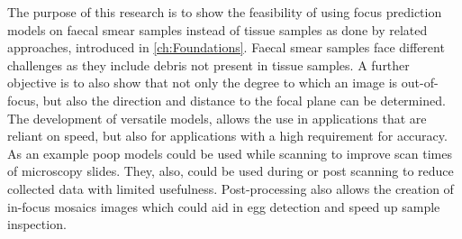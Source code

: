 The purpose of this research is to show the feasibility of using focus prediction models on faecal smear samples instead of tissue samples as done by related approaches, introduced in \autoref{ch:Foundations}. Faecal smear samples face different challenges as they include debris not present in tissue samples.
A further objective is to also show that not only the degree to which an image is out-of-focus, but also the direction and distance to the focal plane can be determined. The development of versatile models, allows the use in applications that are reliant on speed, but also for applications with a high requirement for accuracy. As an example \ac{poop} models could be used while scanning to improve scan times of microscopy slides. They, also, could be used during or post scanning to reduce collected data with limited usefulness. Post-processing also allows the creation of in-focus mosaics images which could aid in egg detection and speed up sample inspection.
